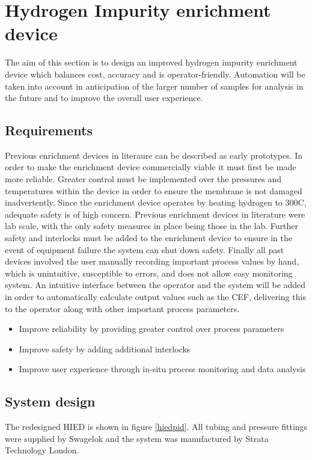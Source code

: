 \section{Hydrogen Impurity enrichment device}
The aim of this section is to design an improved hydrogen impurity enrichment device which balances cost, accuracy and is operator-friendly. Automation will be taken into account in anticipation of the larger number of samples for analysis in the future and to improve the overall user experience. 
\subsection{Requirements}
Previous enrichment devices in literaure can be described as early prototypes.\cite{Ahmed2010} \cite{Murugan2014} In order to make the enrichment device commercially viable it must first be made more reliable. Greater control must be implemented over the pressures and temperatures within the device in order to ensure the membrane is not damaged inadvertently. Since the enrichment device operates by heating hydrogen to 300\textdegree C, adequate safety is of high concern. Previous enrichment devices in literature were lab scale, with the only safety measures in place being those in the lab. Further safety and interlocks must be added to the enrichment device to ensure in the event of equipment failure the system can shut down safety. Finally all past devices involved the user manually recording important process values by hand, which is unintuitive, susceptible to errors, and does not allow easy monitoring system. An intuitive interface between the operator and the system will be added in order to automatically calculate output values such as the CEF, delivering this to the operator along with other important process parameters. 

\begin{itemize}
    \item Improve reliability by providing greater control over process parameters
    \item Improve safety by adding additional interlocks
    \item Improve user experience through in-situ process monitoring and data analysis
\end{itemize}

\subsection{System design}
The redesigned HIED is shown in figure \ref{hiedpid}. All tubing and pressure fittings were supplied by Swagelok \cite{swagelok} and the system was manufactured by Strata Technology London. \cite{stratatechnology}

